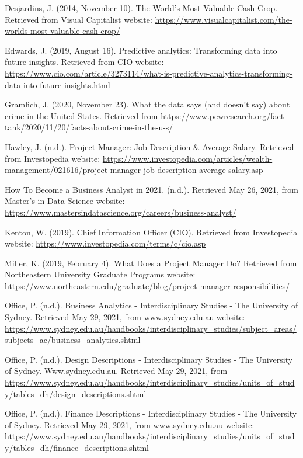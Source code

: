 \documentclass[12pt]{article}
\begin{document}
Desjardins, J. (2014, November 10). The World’s Most Valuable Cash Crop. Retrieved from Visual Capitalist website:
\url{https://www.visualcapitalist.com/the-worlds-most-valuable-cash-crop/}

Edwards, J. (2019, August 16). Predictive analytics: Transforming data into future insights. Retrieved from CIO website:
\url{https://www.cio.com/article/3273114/what-is-predictive-analytics-transforming-data-into-future-insights.html}

Gramlich, J. (2020, November 23). What the data says (and doesn't say) about crime in the United States. Retrieved from \url{https://www.pewresearch.org/fact-tank/2020/11/20/facts-about-crime-in-the-u-s/}

Hawley, J. (n.d.). Project Manager: Job Description \& Average Salary. Retrieved from Investopedia website:
\url{https://www.investopedia.com/articles/wealth-management/021616/project-manager-job-description-average-salary.asp}

How To Become a Business Analyst in 2021. (n.d.). Retrieved May 26, 2021, from Master’s in Data Science website:
\url{https://www.mastersindatascience.org/careers/business-analyst/}

Kenton, W. (2019). Chief Information Officer (CIO). Retrieved from Investopedia website:
\url{https://www.investopedia.com/terms/c/cio.asp}

Miller, K. (2019, February 4). What Does a Project Manager Do? Retrieved from Northeastern University Graduate Programs website:
\url{https://www.northeastern.edu/graduate/blog/project-manager-responsibilities/}

Office, P. (n.d.). Business Analytics - Interdisciplinary Studies - The University of Sydney. Retrieved May 29, 2021, from www.sydney.edu.au website:
\url{https://www.sydney.edu.au/handbooks/interdisciplinary\_studies/subject\_areas/subjects\_ac/business\_analytics.shtml}

Office, P. (n.d.). Design Descriptions - Interdisciplinary Studies - The University of Sydney. Www.sydney.edu.au. Retrieved May 29, 2021, from
\url{ https://www.sydney.edu.au/handbooks/interdisciplinary_studies/units_of_study/tables_dh/design_descriptions.shtml}

Office, P. (n.d.). Finance Descriptions - Interdisciplinary Studies - The University of Sydney. Retrieved May 29, 2021, from www.sydney.edu.au website:
\url{https://www.sydney.edu.au/handbooks/interdisciplinary\_studies/units\_of\_study/tables\_dh/finance\_descriptions.shtml}
\end{document}
